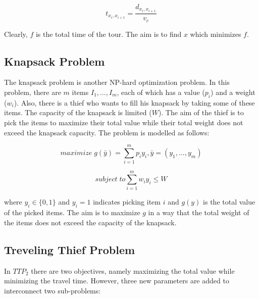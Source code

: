 \documentclass[twocolumn]{IEEEtran}
\begin{document}
\begin{equation}
    t_{x_i,x_{i+1}} =
    \frac{d_{x_i,x_{i+1}}}{v_c}
\end{equation}

Clearly, $f$ is the total time of the tour. The aim is to find $x$ which minimizes $f$. 

\subsection{Knapsack Problem}

The knapsack problem is another NP-hard optimization problem. 
In this problem, there are $m$ items $I_1, ..., I_m$, each of
which has a value ($p_i$) and a weight ($w_i$).
Also, there is a thief who wants to fill his knapsack by taking some of these items.
The capacity of the knapsack is limited ($W$).
The aim of the thief is to pick the items to maximize their total value while
their total weight does not exceed the knapsack capacity.
The problem is modelled as follows:

\begin{equation}
    maximize \; g(\bar{y}) =
    \sum_{i=1}^m p_iy_i, 
    \bar{y} = (y_1, ..., y_m)
\end{equation}

\begin{equation}
    subject \; to
    \sum_{i=1}^m w_iy_i \leq W
\end{equation}

where $y_i \in \{0,1\}$ and $y_i = 1$ indicates picking item $i$ and
$g(y)$ is the total value of the picked items. The aim is to
maximize $g$ in a way that the total weight of the items does not
exceed the capacity of the knapsack. 

\subsection{Treveling Thief Problem}
In $TTP_2$  there are two objectives, namely maximizing the
total value while minimizing the travel time. However, three
new parameters are added to interconnect two sub-problems:
\end{document}
